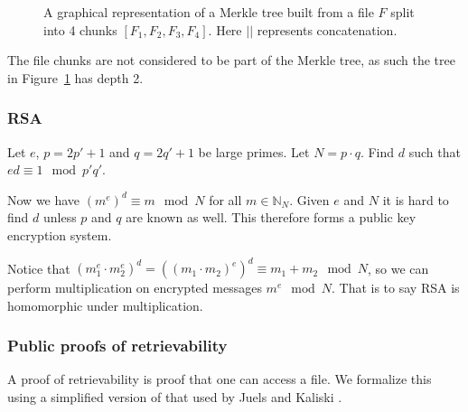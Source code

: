 \documentclass[10pt,twoside,a4paper]{article}
\begin{document}
\begin{figure}[h]
\centering
{}
\caption[A Merkle Tree]{ A graphical representation of a Merkle tree built from a file $F$ split into 4 chunks $[F_1, F_2, F_3, F_4]$.
Here $||$ represents concatenation.}
\label{Merkle example}
\end{figure}

The file chunks are not considered to be part of the Merkle tree, as such the tree in Figure~\ref{Merkle example} has depth 2.


\subsubsection{RSA}

Let $e$, $p = 2p' + 1$ and $q = 2q' + 1$ be large primes.
Let $N = p \cdot q$.
Find $d$ such that $e d \equiv 1 \mod p'q'$.

Now we have $(m^e)^d \equiv m \mod N$ for all $m \in \mathbb{N}_N$.
Given $e$ and $N$ it is hard to find $d$ unless $p$ and $q$ are known as well.
This therefore forms a public key encryption system.

Notice that $(m_1^e \cdot m_2^e)^d = \left((m_1 \cdot m_2)^e\right)^d \equiv m_1 + m_2 \mod N$, so we can perform multiplication on
encrypted messages $m^e \mod N$. 
That is to say RSA is homomorphic under multiplication.


\subsubsection{Public proofs of retrievability}

A proof of retrievability is proof that one can access a file.
We formalize this using a simplified version of that used by Juels and Kaliski \cite{ecc-por}.
\end{document}

